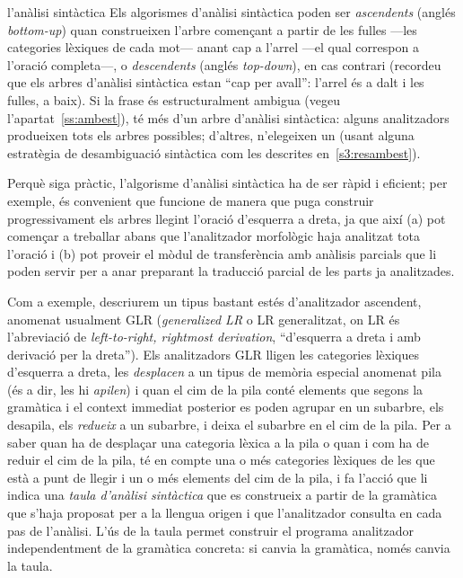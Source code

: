 \begin{persabermes}{l'anàlisi sintàctica}  
  Els algorismes d'anàlisi sintàctica poden ser {\em ascendents}
  (anglés \emph{bottom-up}) quan construeixen l'arbre començant a
  partir de les fulles ---les categories lèxiques de cada mot--- anant
  cap a l'arrel ---el qual correspon a l'oració completa---, o
  \emph{descendents} (anglés \emph{top-down}), en cas contrari
  (recordeu que els arbres d'anàlisi sintàctica estan ``cap per
  avall'': l'arrel és a dalt i les fulles, a baix). Si la frase és
  estructuralment ambigua (vegeu l'apartat~\ref{ss:ambest}), té més
  d'un arbre d'anàlisi sintàctica: alguns analitzadors produeixen tots
  els arbres possibles; d'altres, n'elegeixen un (usant alguna
  estratègia de desambiguació sintàctica com les descrites
  en~\ref{s3:resambest}).

  Perquè siga pràctic, l'algorisme d'anàlisi sintàctica ha de ser
  ràpid i eficient; per exemple, és convenient que funcione de manera
  que puga construir progressivament els arbres llegint l'oració
  d'esquerra a dreta, ja que així (a) pot començar a treballar abans
  que l'analitzador morfològic haja analitzat tota l'oració i (b) pot
  proveir el mòdul de transferència amb anàlisis parcials que li poden
  servir per a anar preparant la traducció parcial de les parts ja
  analitzades.

  Com a exemple, descriurem un tipus bastant estés d'analitzador
  ascendent, anomenat usualment GLR (\emph{generalized LR} o LR
  generalitzat, on LR és l'abreviació de \emph{left-to-right,
    rightmost derivation}, ``d'esquerra a dreta i amb derivació per la
  dreta'').  Els analitzadors GLR lligen les categories lèxiques
  d'esquerra a dreta, les \emph{desplacen} a un tipus de memòria
  especial anomenat pila (és a dir, les hi \emph{apilen}) i quan el
  cim de la pila conté elements que segons la gramàtica i el context
  immediat posterior es poden agrupar en un subarbre, els desapila,
  els \emph{redueix} a un subarbre, i deixa el subarbre en el cim de
  la pila. Per a saber quan ha de desplaçar una categoria lèxica a la
  pila o quan i com ha de reduir el cim de la pila, té en compte una o
  més categories lèxiques de les que està a punt de llegir i un o més
  elements del cim de la pila, i fa l'acció que li indica una
  \emph{taula d'anàlisi sintàctica} que es construeix a partir de la
  gramàtica que s'haja proposat per a la llengua origen i que
  l'analitzador consulta en cada pas de l'anàlisi. L'ús de la taula
  permet construir el programa analitzador independentment de la
  gramàtica concreta: si canvia la gramàtica, només canvia la taula.


\end{persabermes}
